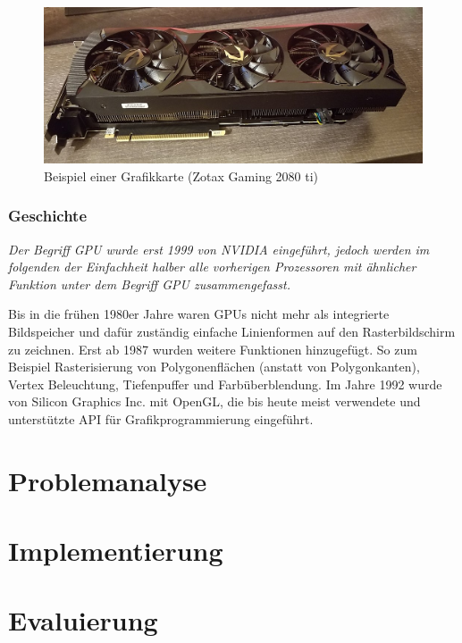 \documentclass[oneside]{ausarbeitung}
\newcommand*{\quotize}[1]{\glqq #1\grqq}
\begin{document}
\begin{figure}
    \includegraphics[width=\textwidth]{images/1024px-Zotac_Gaming_GTX_2080_ti.jpg}
    \caption{Beispiel einer Grafikkarte (Zotax Gaming 2080 ti) \cite{2080_ti_graphics_card}}
    \label{fig:2080_ti_graphics_card}
\end{figure}

\subsection{Geschichte \cite[Vgl.][]{gpu_history}}
\label{sub:GPU_history}
\textit{Der Begriff \quotize{\ac{GPU}} wurde erst 1999 von NVIDIA eingeführt, jedoch werden im folgenden der Einfachheit halber alle vorherigen Prozessoren mit ähnlicher Funktion unter dem Begriff \quotize{\ac{GPU}} zusammengefasst.}

Bis in die frühen 1980er Jahre waren \ac{GPU}s nicht mehr als integrierte Bildspeicher und dafür zuständig einfache Linienformen auf den Rasterbildschirm zu zeichnen. Erst ab 1987 wurden weitere Funktionen hinzugefügt. So zum Beispiel Rasterisierung von Polygonenflächen (anstatt von Polygonkanten), Vertex Beleuchtung, Tiefenpuffer und Farbüberblendung. Im Jahre 1992 wurde von Silicon Graphics Inc. mit OpenGL, die bis heute meist verwendete und unterstützte \ac{API} für Grafikprogrammierung eingeführt.

\chapter{Problemanalyse}
\label{cha:problemanalyse}


\chapter{Implementierung}
\label{cha:implementierung}



\chapter{Evaluierung}
\label{cha:evaluation}
\end{document}
